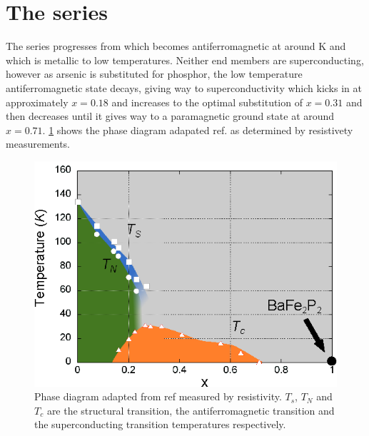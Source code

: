 
\section{The \BaFePAs series}

The \BaFeAsP series progresses from \BaFeAs which becomes antiferromagnetic at around \unit[138]{K} and \BaFeP which is metallic to low temperatures. Neither end members are superconducting, however as arsenic is substituted for phosphor, the low temperature antiferromagnetic state decays, giving way to superconductivity which kicks in at approximately $x=0.18$ and increases to the optimal substitution of $x=0.31$ and then decreases until it gives way to a paramagnetic ground state at around $x=0.71$. \Fig\ref{Fig:3:PhaseDiagram} shows the phase diagram adapated ref. \cite{Nakai2010a} as determined by resistivety measurements.

\begin{figure}
    \begin{center}
        \includegraphics[scale=0.7]{Chapter3-dHvABaFe2P2/Figures/BaFe2P2Series/PhaseDiagram/PhaseDiagram}
        \caption{Phase diagram adapted from ref \cite{Nakai2010a} measured by resistivity. $T_s$, $T_N$ and $T_c$ are the structural transition, the antiferromagnetic transition and the superconducting transition temperatures respectively.}
        \label{Fig:3:PhaseDiagram}
    \end{center}
\end{figure}


